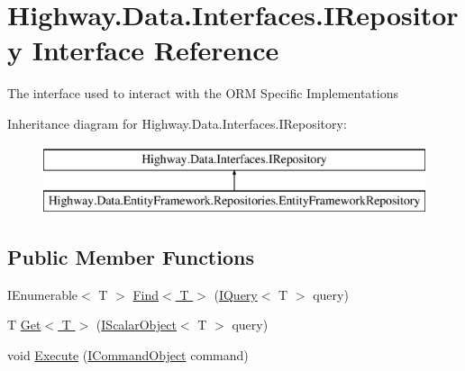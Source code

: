\hypertarget{interface_highway_1_1_data_1_1_interfaces_1_1_i_repository}{\section{Highway.\-Data.\-Interfaces.\-I\-Repository Interface Reference}
\label{interface_highway_1_1_data_1_1_interfaces_1_1_i_repository}
}


The interface used to interact with the O\-R\-M Specific Implementations  


Inheritance diagram for Highway.\-Data.\-Interfaces.\-I\-Repository\-:\begin{figure}[H]
\begin{center}
\leavevmode
\includegraphics[height=2.000000cm]{interface_highway_1_1_data_1_1_interfaces_1_1_i_repository}
\end{center}
\end{figure}
\subsection*{Public Member Functions}
\begin{DoxyCompactItemize}
\item 
I\-Enumerable$<$ T $>$ \hyperlink{interface_highway_1_1_data_1_1_interfaces_1_1_i_repository_a18bd55ae31839881dc43cb0ba958086b}{Find$<$ T $>$} (\hyperlink{interface_highway_1_1_data_1_1_interfaces_1_1_i_query-g}{I\-Query}$<$ T $>$ query)
\begin{DoxyCompactList}\small\item\em \end{DoxyCompactList}\item 
T \hyperlink{interface_highway_1_1_data_1_1_interfaces_1_1_i_repository_af4256e7e2f82fd545161eeedd323712b}{Get$<$ T $>$} (\hyperlink{interface_highway_1_1_data_1_1_interfaces_1_1_i_scalar_object-g}{I\-Scalar\-Object}$<$ T $>$ query)
\begin{DoxyCompactList}\small\item\em \end{DoxyCompactList}\item 
void \hyperlink{interface_highway_1_1_data_1_1_interfaces_1_1_i_repository_a2f2f0b12b547d9d5eeaf18d013b7c008}{Execute} (\hyperlink{interface_highway_1_1_data_1_1_interfaces_1_1_i_command_object}{I\-Command\-Object} command)
\begin{DoxyCompactList}\small\item\em \end{DoxyCompactList}\end{DoxyCompactItemize}
